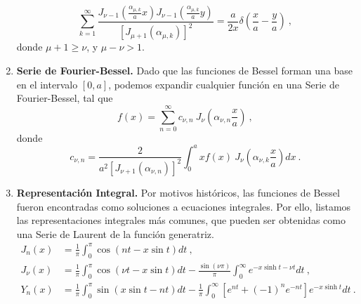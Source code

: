 \begin{propiedad}
\begin{enumerate}
        \begin{equation}
            \sum_{k=1}^\infty \frac{J_{\nu-1} \left(\frac{ \alpha_{\mu, k}}{a}x \right) J_{\nu-1} \left(\frac{\alpha_{\mu, k}}{a} y \right)}{\left[J_{\mu+1}(\alpha_{\mu, k})\right]^2} = \frac{a}{2x} \delta\left( \frac{x}{a} - \frac{y}{a} \right) \ ,
        \end{equation}
        donde $\mu + 1 \geq \nu$, y $\mu - \nu > 1$.
        \item \textbf{Serie de Fourier-Bessel.} Dado que las funciones de Bessel forman una base en el intervalo $[0,a]$, podemos expandir cualquier función en una Serie de Fourier-Bessel, tal que
        \begin{equation}
            f(x) = \sum_{n=0}^\infty c_{\nu, n} \ J_\nu\left(\alpha_{\nu, n} \frac{x}{a}\right) \ ,
        \end{equation}
        donde
        \begin{equation}
            c_{\nu, n} = \frac{2}{a^2 \left[J_{\nu+1}(\alpha_{\nu, n})\right]^2} \int_0^a x f(x) \ J_\nu\left( \alpha_{\nu, k} \frac{x}{a} \right) dx \ .
        \end{equation}
        \item \textbf{Representación Integral.} Por motivos históricos, las funciones de Bessel fueron encontradas como soluciones a ecuaciones integrales. Por ello, listamos las representaciones integrales más comunes, que pueden ser obtenidas como una Serie de Laurent de la función generatriz.
        \begin{align}
            J_n(x) & = \frac{1}{\pi}\int_0^\pi \cos(nt - x\sin t) dt \ , \\
            J_\nu(x) & = \frac{1}{\pi} \int_0^\pi \cos(\nu t - x\sin t) dt - \frac{\sin(\nu \pi)}{\pi} \int_0^\infty e^{-x \sinh t - \nu t} dt \ , \\
            Y_n(x) & = \frac{1}{\pi} \int_0^\pi \sin(x\sin t - nt) dt - \frac{1}{\pi} \int_0^\infty \left[e^{nt} + (-1)^n e^{-nt} \right] e^{-x \sinh t} dt \ .
        \end{align}
    

\end{enumerate}
\end{propiedad}
